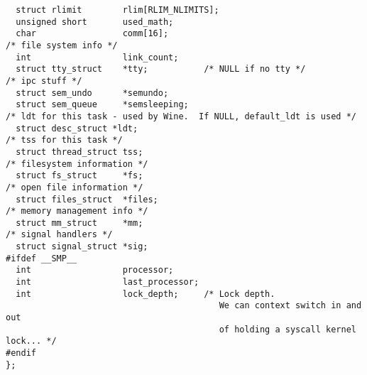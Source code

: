 \documentclass[10pt,letterpaper,onecolumn,draftclsnofoot]{IEEEtran}
\begin{document}
\begin{lstlisting}
  struct rlimit        rlim[RLIM_NLIMITS];
  unsigned short       used_math;
  char                 comm[16];
/* file system info */
  int                  link_count;
  struct tty_struct    *tty;           /* NULL if no tty */
/* ipc stuff */
  struct sem_undo      *semundo;
  struct sem_queue     *semsleeping;
/* ldt for this task - used by Wine.  If NULL, default_ldt is used */
  struct desc_struct *ldt;
/* tss for this task */
  struct thread_struct tss;
/* filesystem information */
  struct fs_struct     *fs;
/* open file information */
  struct files_struct  *files;
/* memory management info */
  struct mm_struct     *mm;
/* signal handlers */
  struct signal_struct *sig;
#ifdef __SMP__
  int                  processor;
  int                  last_processor;
  int                  lock_depth;     /* Lock depth.
                                          We can context switch in and out
                                          of holding a syscall kernel lock... */
#endif
};
\end{lstlisting}
\clearpage
\end{document}
